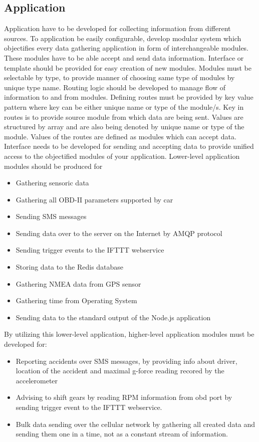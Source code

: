 \subsection{Application}
Application have to be developed for collecting information from different sources. To application be easily configurable, develop modular system which objectifies every data gathering application in form of interchangeable modules. These modules have to be able  accept and send data information. Interface or template should be provided for easy creation of new modules.  Modules must be selectable by type, to provide manner of choosing same type of modules by unique type name. Routing logic should be developed to manage flow of information to and from modules. Defining routes must be provided by key value pattern where key can be either unique name or type of the module/s. Key in routes is to provide source module from which data are being sent. Values are structured by array and are also being denoted by unique name or type of the module. Values of the routes are defined as modules which can accept data. Interface needs to be developed for sending and accepting data to provide unified access to the objectified modules of your application. Lower-level application modules should be produced for
\begin{itemize}
 	\item Gathering sensoric data 
 	\item Gathering all OBD-II parameters supported by car
 	\item Sending SMS messages
 	\item Sending data over to the server on the Internet by AMQP protocol
 	\item Sending trigger events to the IFTTT webservice
 	\item Storing data to the Redis database
 	\item Gathering NMEA data from GPS sensor
 	\item Gathering time from Operating System
 	\item Sending data to the standard output of the Node.js application
 \end{itemize} 
 By utilizing this lower-level application, higher-level application modules must be developed for:
\begin{itemize}
	\item Reporting accidents over SMS messages, by providing info about driver, location of the accident and maximal g-force reading recored by the accelerometer
	\item Advising to shift gears by reading RPM information from \gls{obd} port by sending trigger event to the IFTTT webservice.
	\item Bulk data sending over the cellular network by gathering all created data and sending them one in a time, not as a constant stream of information.
\end{itemize}
